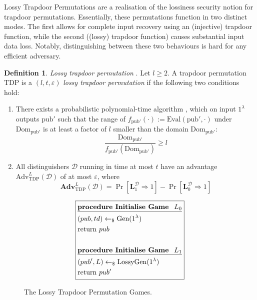 \documentclass[]{final_report}
\theoremstyle{definition}
\newtheorem{definition}{Definition}[chapter]
\begin{document}
Lossy Trapdoor Permutations are a realisation of the lossiness security notion for trapdoor permutations. Essentially, these permutations function in two distinct modes. The first allows for complete input recovery using an (injective) trapdoor function, while the second ((lossy) trapdoor function) causes substantial input data loss. Notably, distinguishing between these two behaviours is hard for any efficient adversary.

\begin{definition}
\textit{Lossy trapdoor permutation} \cite{10.1145/1374376.1374406, kakvi2018optimal}. Let \( l \geq 2 \). A trapdoor permutation \( \text{TDP} \) is a \( (l, t, \varepsilon) \) \textit{lossy trapdoor permutation} if the following two conditions hold:

\begin{enumerate}
    \item There exists a probabilistic polynomial-time algorithm , which on input \( 1^\lambda \) outputs \( \text{pub}' \) such that the range of \( f_{\text{pub}'}(\cdot) := \text{Eval}(\text{pub}', \cdot) \) under \( \text{Dom}_{\text{pub}'} \) is at least a factor of \( l \) smaller than the domain \( \text{Dom}_{\text{pub}'} \): 
    \[ \frac{\text{Dom}_{\text{pub}'}}{f_{\text{pub}'}(\text{Dom}_{\text{pub}'})} \geq l \]
    
    \item All distinguishers \( \mathcal{D} \) running in time at most \( t \) have an advantage \( \text{Adv}^L_{\text{TDP}}(\mathcal{D}) \) of at most \( \varepsilon \), where
    \[ \textbf{Adv}^L_{\text{TDP}}(\mathcal{D}) = \Pr[\textbf{L}_{1}^{\mathcal{D}}  \Rightarrow 1] - \Pr[\textbf{L}_{0}^{\mathcal{D}} \Rightarrow 1] \]
\end{enumerate}
\end{definition}

\begin{figure}[H]
\[
\boxed{
\begin{aligned}
&\underline{\textbf{\text{procedure Initialise Game } \(L_0\)}} \\
&(pub, td) \leftarrow_\$ \text{Gen}(1^\lambda) \\
&\text{return } pub \\
\\
&\underline{\textbf{\text{procedure Initialise Game } \(L_1\)}} \\
&(pub', L) \leftarrow_\$ \text{LossyGen}(1^\lambda) \\
&\text{return } pub' \\
\end{aligned}
}
\]
\caption{The Lossy Trapdoor Permutation Games.}
\label{fig:lossy_trapdoor_permutation_games}
\end{figure}
\end{document}

